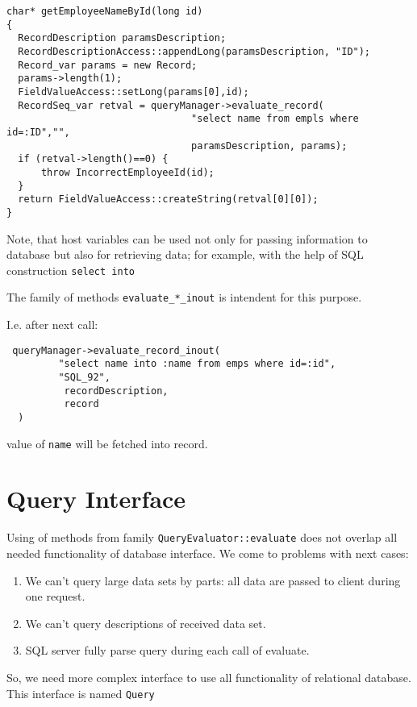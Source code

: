 \documentclass[10pt]{article}
\begin{document}
\begin{verbatim}
char* getEmployeeNameById(long id)
{
  RecordDescription paramsDescription;
  RecordDescriptionAccess::appendLong(paramsDescription, "ID");
  Record_var params = new Record;
  params->length(1);
  FieldValueAccess::setLong(params[0],id);
  RecordSeq_var retval = queryManager->evaluate_record(
                                "select name from empls where id=:ID","",
                                paramsDescription, params);
  if (retval->length()==0) {
      throw IncorrectEmployeeId(id);
  }
  return FieldValueAccess::createString(retval[0][0]);
}

\end{verbatim}

 Note, that host variables can be used not only  for passing information
to database but also for retrieving data; for example, with the help of 
SQL construction \verb|select into|

 The family of methods \verb|evaluate_*_inout| is intendent for this purpose.

 I.e. after next call: 
\begin{verbatim}
 queryManager->evaluate_record_inout(
         "select name into :name from emps where id=:id",
         "SQL_92",
          recordDescription,
          record
  ) 
\end{verbatim}

 value of \verb|name| will be fetched into record.

\section{ Query Interface }

 Using of methods from family \verb|QueryEvaluator::evaluate| does not
overlap all needed functionality of database interface. 
 We come to problems with next cases:
 \begin{enumerate}
   \item We can't query large data sets by parts: all data are passed to client
  during one request.
   \item We can't query descriptions of received data set.
   \item SQL server fully parse query during each call of evaluate.
 \end{enumerate}

 So, we need more complex interface to use  all functionality of 
 relational database. This interface is named \verb|Query|
\end{document}
